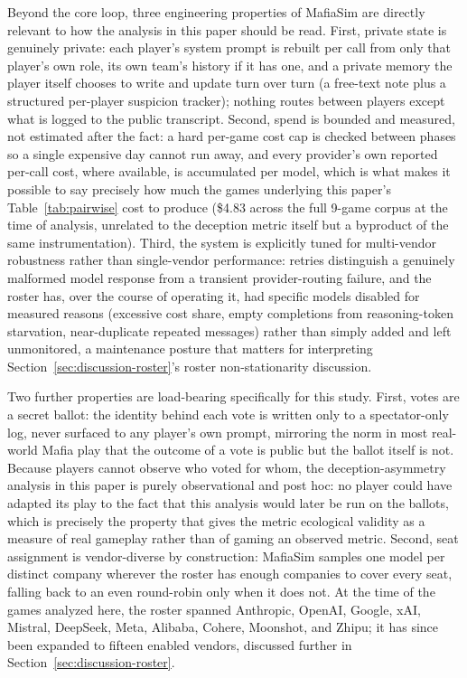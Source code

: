 \documentclass{article}
\begin{document}
Beyond the core loop, three engineering properties of MafiaSim are directly relevant to how the analysis in this paper should be read. First, private state is genuinely private: each player's system prompt is rebuilt per call from only that player's own role, its own team's history if it has one, and a private memory the player itself chooses to write and update turn over turn (a free-text note plus a structured per-player suspicion tracker); nothing routes between players except what is logged to the public transcript. Second, spend is bounded and measured, not estimated after the fact: a hard per-game cost cap is checked between phases so a single expensive day cannot run away, and every provider's own reported per-call cost, where available, is accumulated per model, which is what makes it possible to say precisely how much the games underlying this paper's Table~\ref{tab:pairwise} cost to produce (\$4.83 across the full 9-game corpus at the time of analysis, unrelated to the deception metric itself but a byproduct of the same instrumentation). Third, the system is explicitly tuned for multi-vendor robustness rather than single-vendor performance: retries distinguish a genuinely malformed model response from a transient provider-routing failure, and the roster has, over the course of operating it, had specific models disabled for measured reasons (excessive cost share, empty completions from reasoning-token starvation, near-duplicate repeated messages) rather than simply added and left unmonitored, a maintenance posture that matters for interpreting Section~\ref{sec:discussion-roster}'s roster non-stationarity discussion.

Two further properties are load-bearing specifically for this study. First, votes are a secret ballot: the identity behind each vote is written only to a spectator-only log, never surfaced to any player's own prompt, mirroring the norm in most real-world Mafia play that the outcome of a vote is public but the ballot itself is not. Because players cannot observe who voted for whom, the deception-asymmetry analysis in this paper is purely observational and post hoc: no player could have adapted its play to the fact that this analysis would later be run on the ballots, which is precisely the property that gives the metric ecological validity as a measure of real gameplay rather than of gaming an observed metric. Second, seat assignment is vendor-diverse by construction: MafiaSim samples one model per distinct company wherever the roster has enough companies to cover every seat, falling back to an even round-robin only when it does not. At the time of the games analyzed here, the roster spanned Anthropic, OpenAI, Google, xAI, Mistral, DeepSeek, Meta, Alibaba, Cohere, Moonshot, and Zhipu; it has since been expanded to fifteen enabled vendors, discussed further in Section~\ref{sec:discussion-roster}.
\end{document}

